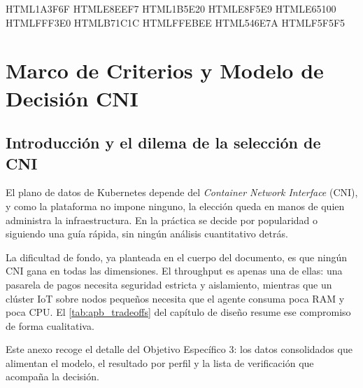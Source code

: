 
\definecolor{oe3azul}    {HTML}{1A3F6F}   %
\definecolor{oe3azulcl}  {HTML}{E8EEF7}   %
\definecolor{oe3verde}   {HTML}{1B5E20}   %
\definecolor{oe3verdecl} {HTML}{E8F5E9}
\definecolor{oe3ambar}   {HTML}{E65100}   %
\definecolor{oe3ambarcl} {HTML}{FFF3E0}
\definecolor{oe3rojo}    {HTML}{B71C1C}   %
\definecolor{oe3rojocl}  {HTML}{FFEBEE}
\definecolor{oe3gris}    {HTML}{546E7A}   %
\definecolor{oe3griscl}  {HTML}{F5F5F5}  %


\chapter{Marco de Criterios y Modelo de Decisión CNI} \label{chap:apendice_oe3}

\section{Introducción y el dilema de la selección de CNI} \label{sec:apb_oe3_intro}

El plano de datos de Kubernetes depende del \emph{Container Network Interface} (CNI), y como la plataforma no impone ninguno, la elección queda en manos de quien administra la infraestructura. En la práctica se decide por popularidad o siguiendo una guía rápida, sin ningún análisis cuantitativo detrás.

La dificultad de fondo, ya planteada en el cuerpo del documento, es que ningún CNI gana en todas las dimensiones. El throughput es apenas una de ellas: una pasarela de pagos necesita seguridad estricta y aislamiento, mientras que un clúster IoT sobre nodos pequeños necesita que el agente consuma poca RAM y poca CPU. El \cref{tab:apb_tradeoffs} del capítulo de diseño resume ese compromiso de forma cualitativa.

Este anexo recoge el detalle del Objetivo Específico 3: los datos consolidados que alimentan el modelo, el resultado por perfil y la lista de verificación que acompaña la decisión.

\iffalse
